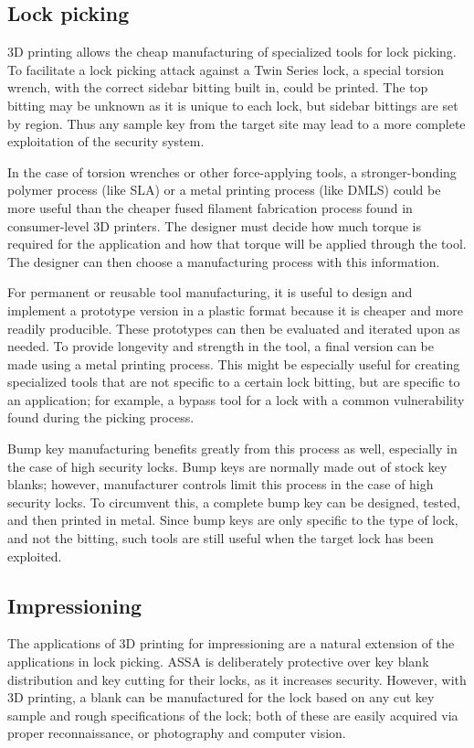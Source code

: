 \documentclass{acm_proc_article-sp}
\begin{document}
\subsection{Lock picking}
3D printing allows the cheap manufacturing of specialized tools for lock picking. To facilitate a lock picking attack against a Twin Series lock, a special torsion wrench, with the correct sidebar bitting built in, could be printed. The top bitting may be unknown as it is unique to each lock, but sidebar bittings are set by region. Thus any sample key from the target site may lead to a more complete exploitation of the security system.

In the case of torsion wrenches or other force-applying tools, a stronger-bonding polymer process (like SLA) or a metal printing process (like DMLS) could be more useful than the cheaper fused filament fabrication process found in consumer-level 3D printers. The designer must decide how much torque is required for the application and how that torque will be applied through the tool. The designer can then choose a manufacturing process with this information.

For permanent or reusable tool manufacturing, it is useful to design and implement a prototype version in a plastic format because it is cheaper and more readily producible. These prototypes can then be evaluated and iterated upon as needed. To provide longevity and strength in the tool, a final version can be made using a metal printing process. This might be especially useful for creating specialized tools that are not specific to a certain lock bitting, but are specific to an application; for example, a bypass tool for a lock with a common vulnerability found during the picking process.

Bump key manufacturing benefits greatly from this process as well, especially in the case of high security locks. Bump keys are normally made out of stock key blanks; however, manufacturer controls limit this process in the case of high security locks. To circumvent this, a complete bump key can be designed, tested, and then printed in metal. Since bump keys are only specific to the type of lock, and not the bitting, such tools are still useful when the target lock has been exploited.

\subsection{Impressioning}
The applications of 3D printing for impressioning are a natural extension of the applications in lock picking. ASSA is deliberately protective over key blank distribution and key cutting for their locks, as it increases security. However, with 3D printing, a blank can be manufactured for the lock based on any cut key sample and rough specifications of the lock; both of these are easily acquired via proper reconnaissance, or photography and computer vision.
\end{document}
